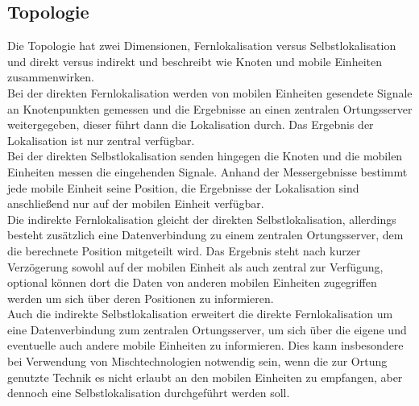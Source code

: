 \subsection{Topologie}
Die Topologie hat zwei Dimensionen, Fernlokalisation versus Selbstlokalisation und direkt versus indirekt und beschreibt wie Knoten und mobile Einheiten zusammenwirken. \\
Bei der direkten Fernlokalisation werden von mobilen Einheiten gesendete Signale an Knotenpunkten gemessen und die Ergebnisse an einen zentralen Ortungsserver weitergegeben, dieser führt dann die Lokalisation durch. Das Ergebnis der Lokalisation ist nur zentral verfügbar. \\
Bei der direkten Selbstlokalisation senden hingegen die Knoten und die mobilen Einheiten messen die eingehenden Signale. Anhand der Messergebnisse bestimmt jede mobile Einheit seine Position, die Ergebnisse der Lokalisation sind anschließend nur auf der mobilen Einheit verfügbar. \\
Die indirekte Fernlokalisation gleicht der direkten Selbstlokalisation, allerdings besteht zusätzlich eine Datenverbindung zu einem zentralen Ortungsserver, dem die berechnete Position mitgeteilt wird. Das Ergebnis steht nach kurzer Verzögerung sowohl auf der mobilen Einheit als auch zentral zur Verfügung, optional können dort die Daten von anderen mobilen Einheiten zugegriffen werden um sich über deren Positionen zu informieren. \\
Auch die indirekte Selbstlokalisation erweitert die direkte Fernlokalisation um eine Datenverbindung zum zentralen Ortungsserver, um sich über die eigene und eventuelle auch andere mobile Einheiten zu informieren. Dies kann insbesondere bei Verwendung von Mischtechnologien notwendig sein, wenn die zur Ortung genutzte Technik es nicht erlaubt an den mobilen Einheiten zu empfangen, aber dennoch eine Selbstlokalisation durchgeführt werden soll.

